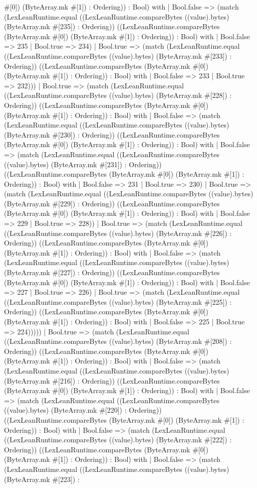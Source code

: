 \documentclass[11pt]{article}
\begin{document}
\#[0]) (ByteArray.mk \#[1]) : Ordering)) : Bool) with | Bool.false => (match (LexLeanRuntime.equal ((LexLeanRuntime.compareBytes ((value).bytes) (ByteArray.mk \#[235]) : Ordering)) ((LexLeanRuntime.compareBytes (ByteArray.mk \#[0]) (ByteArray.mk \#[1]) : Ordering)) : Bool) with | Bool.false => 235 | Bool.true => 234) | Bool.true => (match (LexLeanRuntime.equal ((LexLeanRuntime.compareBytes ((value).bytes) (ByteArray.mk \#[233]) : Ordering)) ((LexLeanRuntime.compareBytes (ByteArray.mk \#[0]) (ByteArray.mk \#[1]) : Ordering)) : Bool) with | Bool.false => 233 | Bool.true => 232))) | Bool.true => (match (LexLeanRuntime.equal ((LexLeanRuntime.compareBytes ((value).bytes) (ByteArray.mk \#[228]) : Ordering)) ((LexLeanRuntime.compareBytes (ByteArray.mk \#[0]) (ByteArray.mk \#[1]) : Ordering)) : Bool) with | Bool.false => (match (LexLeanRuntime.equal ((LexLeanRuntime.compareBytes ((value).bytes) (ByteArray.mk \#[230]) : Ordering)) ((LexLeanRuntime.compareBytes (ByteArray.mk \#[0]) (ByteArray.mk \#[1]) : Ordering)) : Bool) with | Bool.false => (match (LexLeanRuntime.equal ((LexLeanRuntime.compareBytes ((value).bytes) (ByteArray.mk \#[231]) : Ordering)) ((LexLeanRuntime.compareBytes (ByteArray.mk \#[0]) (ByteArray.mk \#[1]) : Ordering)) : Bool) with | Bool.false => 231 | Bool.true => 230) | Bool.true => (match (LexLeanRuntime.equal ((LexLeanRuntime.compareBytes ((value).bytes) (ByteArray.mk \#[229]) : Ordering)) ((LexLeanRuntime.compareBytes (ByteArray.mk \#[0]) (ByteArray.mk \#[1]) : Ordering)) : Bool) with | Bool.false => 229 | Bool.true => 228)) | Bool.true => (match (LexLeanRuntime.equal ((LexLeanRuntime.compareBytes ((value).bytes) (ByteArray.mk \#[226]) : Ordering)) ((LexLeanRuntime.compareBytes (ByteArray.mk \#[0]) (ByteArray.mk \#[1]) : Ordering)) : Bool) with | Bool.false => (match (LexLeanRuntime.equal ((LexLeanRuntime.compareBytes ((value).bytes) (ByteArray.mk \#[227]) : Ordering)) ((LexLeanRuntime.compareBytes (ByteArray.mk \#[0]) (ByteArray.mk \#[1]) : Ordering)) : Bool) with | Bool.false => 227 | Bool.true => 226) | Bool.true => (match (LexLeanRuntime.equal ((LexLeanRuntime.compareBytes ((value).bytes) (ByteArray.mk \#[225]) : Ordering)) ((LexLeanRuntime.compareBytes (ByteArray.mk \#[0]) (ByteArray.mk \#[1]) : Ordering)) : Bool) with | Bool.false => 225 | Bool.true => 224))))) | Bool.true => (match (LexLeanRuntime.equal ((LexLeanRuntime.compareBytes ((value).bytes) (ByteArray.mk \#[208]) : Ordering)) ((LexLeanRuntime.compareBytes (ByteArray.mk \#[0]) (ByteArray.mk \#[1]) : Ordering)) : Bool) with | Bool.false => (match (LexLeanRuntime.equal ((LexLeanRuntime.compareBytes ((value).bytes) (ByteArray.mk \#[216]) : Ordering)) ((LexLeanRuntime.compareBytes (ByteArray.mk \#[0]) (ByteArray.mk \#[1]) : Ordering)) : Bool) with | Bool.false => (match (LexLeanRuntime.equal ((LexLeanRuntime.compareBytes ((value).bytes) (ByteArray.mk \#[220]) : Ordering)) ((LexLeanRuntime.compareBytes (ByteArray.mk \#[0]) (ByteArray.mk \#[1]) : Ordering)) : Bool) with | Bool.false => (match (LexLeanRuntime.equal ((LexLeanRuntime.compareBytes ((value).bytes) (ByteArray.mk \#[222]) : Ordering)) ((LexLeanRuntime.compareBytes (ByteArray.mk \#[0]) (ByteArray.mk \#[1]) : Ordering)) : Bool) with | Bool.false => (match (LexLeanRuntime.equal ((LexLeanRuntime.compareBytes ((value).bytes) (ByteArray.mk \#[223]) : 
\end{document}
